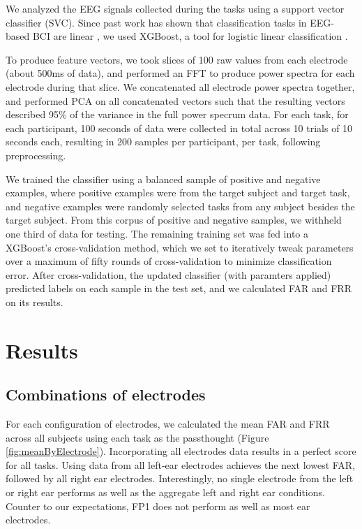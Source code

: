 \documentclass[letterpaper,twocolumn,10pt]{article}
\begin{document}
We analyzed the EEG signals collected during the tasks using a support vector classifier (SVC). Since past work has shown that classification tasks in EEG-based BCI are linear \cite{Garrett2003a}, we used XGBoost, a tool for logistic linear classification \cite{Chen2016}.

To produce feature vectors, we took slices of 100 raw values from each electrode (about 500ms of data), and performed an FFT to produce power spectra for each electrode during that slice. We concatenated all electrode power spectra together, and performed PCA on all concatenated vectors such that the resulting vectors described 95\% of the variance in the full power specrum data. For each task, for each participant, 100 seconds of data were collected in total across 10 trials of 10 seconds each, resulting in 200 samples per participant, per task, following preprocessing.

We trained the classifier using a balanced sample of positive and negative examples, where positive examples were from the target subject and target task, and negative examples were randomly selected tasks from any subject besides the target subject.
From this corpus of positive and negative samples, we withheld one third of data for testing. 
The remaining training set was fed into a XGBoost's cross-validation method, which we set to iteratively tweak parameters over a maximum of fifty rounds of cross-validation to minimize classification error.
After cross-validation, the updated classifier (with paramters applied) predicted labels on each sample in the test set, and we calculated FAR and FRR on its results.

\section{Results}
\label{sec:org6705b1d}
\subsection{Combinations of electrodes}
\label{sec:org21b14ae}

For each configuration of electrodes, we calculated the mean FAR and FRR across all subjects using each task as the passthought (Figure \ref{fig:meanByElectrode}).
Incorporating all electrodes data results in a perfect score for all tasks.
Using data from all left-ear electrodes achieves the next lowest FAR, followed by all right ear electrodes.
Interestingly, no single electrode from the left or right ear performs as well as the aggregate left and right ear conditions. 
Counter to our expectations, FP1 does not perform as well as most ear electrodes.
\end{document}
